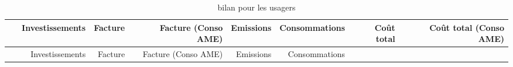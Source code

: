 
\begin{longtable}[]{@{}crrrrrrr@{}}
\caption{bilan pour les usagers}\tabularnewline
\toprule
\begin{minipage}[b]{0.10\columnwidth}\centering\strut
~\strut
\end{minipage} & \begin{minipage}[b]{0.11\columnwidth}\raggedleft\strut
Investissements\strut
\end{minipage} & \begin{minipage}[b]{0.06\columnwidth}\raggedleft\strut
Facture\strut
\end{minipage} & \begin{minipage}[b]{0.13\columnwidth}\raggedleft\strut
Facture (Conso AME)\strut
\end{minipage} & \begin{minipage}[b]{0.07\columnwidth}\raggedleft\strut
Emissions\strut
\end{minipage} & \begin{minipage}[b]{0.09\columnwidth}\raggedleft\strut
Consommations\strut
\end{minipage} & \begin{minipage}[b]{0.08\columnwidth}\raggedleft\strut
Coût total\strut
\end{minipage} & \begin{minipage}[b]{0.14\columnwidth}\raggedleft\strut
Coût total (Conso AME)\strut
\end{minipage}\tabularnewline
\midrule
\endfirsthead
\toprule
\begin{minipage}[b]{0.10\columnwidth}\centering\strut
~\strut
\end{minipage} & \begin{minipage}[b]{0.11\columnwidth}\raggedleft\strut
Investissements\strut
\end{minipage} & \begin{minipage}[b]{0.06\columnwidth}\raggedleft\strut
Facture\strut
\end{minipage} & \begin{minipage}[b]{0.13\columnwidth}\raggedleft\strut
Facture (Conso AME)\strut
\end{minipage} & \begin{minipage}[b]{0.07\columnwidth}\raggedleft\strut
Emissions\strut
\end{minipage} & \begin{minipage}[b]{0.09\columnwidth}\raggedleft\strut
Consommations\strut
\end{minipage} & \begin{minipage}[b]{0.08\columnwidth}\raggedleft\strut

\end{minipage}
\end{longtable}
